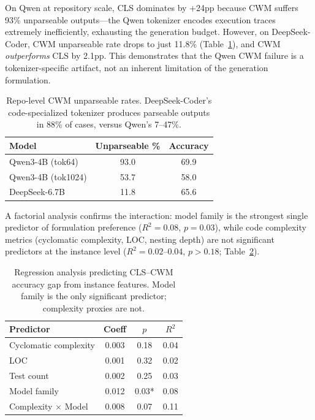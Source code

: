 \documentclass[11pt,a4paper]{article}
\begin{document}
On Qwen at repository scale, CLS dominates by +24pp because CWM suffers 93\% unparseable outputs---the Qwen tokenizer encodes execution traces extremely inefficiently, exhausting the generation budget. However, on DeepSeek-Coder, CWM unparseable rate drops to just 11.8\% (Table~\ref{tab:unparseable}), and CWM \emph{outperforms} CLS by 2.1pp. This demonstrates that the Qwen CWM failure is a tokenizer-specific artifact, not an inherent limitation of the generation formulation.

\begin{table}[t]
\centering
\small
\begin{tabular}{lcc}
\toprule
\textbf{Model} & \textbf{Unparseable \%} & \textbf{Accuracy} \\
\midrule
Qwen3-4B (tok64) & 93.0 & 69.9 \\
Qwen3-4B (tok1024) & 53.7 & 58.0 \\
DeepSeek-6.7B & 11.8 & 65.6 \\
\bottomrule
\end{tabular}
\caption{Repo-level CWM unparseable rates. DeepSeek-Coder's code-specialized tokenizer produces parseable outputs in 88\% of cases, versus Qwen's 7--47\%.}
\label{tab:unparseable}
\end{table}

A factorial analysis confirms the interaction: model family is the strongest single predictor of formulation preference ($R^2=0.08$, $p=0.03$), while code complexity metrics (cyclomatic complexity, LOC, nesting depth) are not significant predictors at the instance level ($R^2=0.02$--0.04, $p>0.18$; Table~\ref{tab:regression}).

\begin{table}[t]
\centering
\small
\begin{tabular}{lccc}
\toprule
\textbf{Predictor} & \textbf{Coeff} & \textbf{$p$} & \textbf{$R^2$} \\
\midrule
Cyclomatic complexity & 0.003 & 0.18 & 0.04 \\
LOC & 0.001 & 0.32 & 0.02 \\
Test count & 0.002 & 0.25 & 0.03 \\
Model family & 0.012 & 0.03* & 0.08 \\
Complexity $\times$ Model & 0.008 & 0.07 & 0.11 \\
\bottomrule
\end{tabular}
\caption{Regression analysis predicting CLS--CWM accuracy gap from instance features. Model family is the only significant predictor; complexity proxies are not.}
\label{tab:regression}
\end{table}
\end{document}
